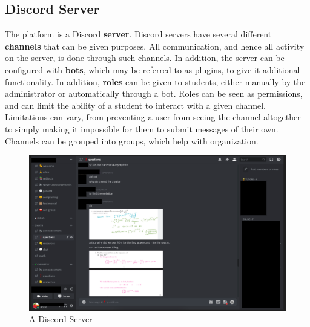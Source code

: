 \documentclass{business}
\begin{document}
    \subsection{Discord Server}
    The platform is a Discord \textbf{server}. Discord servers have several different \textbf{channels} that can be given purposes. All communication, and hence all activity on the server, is done through such channels. In addition, the server can be configured with \textbf{bots}, which may be referred to as plugins, to give it additional functionality. In addition, \textbf{roles} can be given to students, either manually by the administrator or automatically through a bot. Roles can be seen as permissions, and can limit the ability of a student to interact with a given channel. Limitations can vary, from preventing a user from seeing the channel altogether to simply making it impossible for them to submit messages of their own. Channels can be grouped into groups, which help with organization.
    \begin{figure}
        \centering
        \caption{A Discord Server}
        \includegraphics[scale=0.5]{images/general-server-redacted.png}
    \end{figure} 
\end{document}
